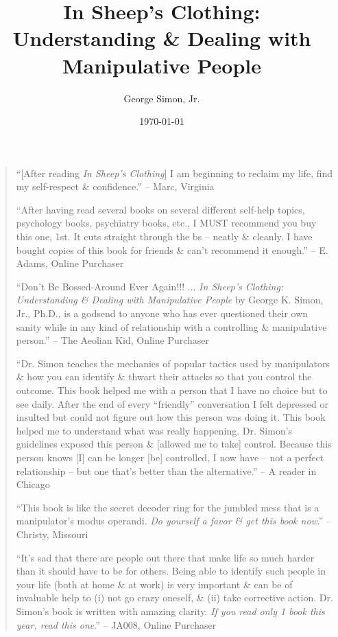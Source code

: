 \documentclass{article}
\title{In Sheep's Clothing: Understanding \& Dealing with Manipulative People}
\author{George Simon, Jr.}
\date{\today}
\numberwithin{equation}{section}
\begin{document}
\maketitle
\tableofcontents
\vspace{5mm}
\begin{quotation}
	``[After reading \textit{In Sheep's Clothing}] I am beginning to reclaim my life, find my self-respect \& confidence.'' -- Marc, Virginia
	
	``After having read several books on several different self-help topics, psychology books, psychiatry books, etc., I MUST recommend you buy this one, 1st. It cuts straight through the bs -- neatly \& cleanly. I have bought copies of this book for friends \& can't recommend it enough.'' -- E. Adams, Online Purchaser
	
	``Don't Be Bossed-Around Ever Again!!! $\ldots$ \textit{In Sheep's Clothing: Understanding \& Dealing with Manipulative People} by George K. Simon, Jr., Ph.D., is a godsend to anyone who has ever questioned their own sanity while in any kind of relationship with a controlling \& manipulative person.'' -- The Aeolian Kid, Online Purchaser
	
	``Dr. Simon teaches the mechanics of popular tactics used by manipulators \& how you can identify \& thwart their attacks so that you control the outcome. This book helped me with a person that I have no choice but to see daily. After the end of every ``friendly'' conversation I felt depressed or insulted but could not figure out how this person was doing it. This book helped me to understand what was really happening. Dr. Simon's guidelines exposed this person \& [allowed me to take] control. Because this person knows [I] can be longer [be] controlled, I now have -- not a perfect relationship -- but one that's better than the alternative.'' -- A reader in Chicago
	
	``This book is like the secret decoder ring for the jumbled mess that is a manipulator's modus operandi. \textit{Do yourself a favor \& get this book now}.'' -- Christy, Missouri
	
	``It's sad that there are people out there that make life so much harder than it should have to be for others. Being able to identify such people in your life (both at home \& at work) is very important \& can be of invaluable help to (i) not go crazy oneself, \& (ii) take corrective action. Dr. Simon's book is written with amazing clarity. \textit{If you read only 1 book this year, read this one}.'' -- JA008, Online Purchaser
	

\end{quotation}
\end{document}
